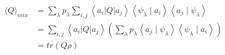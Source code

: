 $$
\begin{aligned}
\langle Q\rangle_{mix} &=\sum_{\lambda} p_{\lambda} \sum_{i, j} \left\langle a_{i}|Q| a_{j}\right\rangle  \left\langle\psi_{\lambda} \mid a_{i}\right\rangle\left\langle a_{j} \mid \psi_{\lambda}\right\rangle\\
&=\sum_{i, j} \left\langle a_{i}|Q| a_{j}\right\rangle \left(\sum_{\lambda} p_{\lambda} \left\langle a_{j} \mid \psi_{\lambda}\right\rangle\left\langle\psi_{\lambda} \mid a_{i}\right\rangle\right) \\
&=tr(Q \rho)
\end{aligned}
$$



 
 

 
